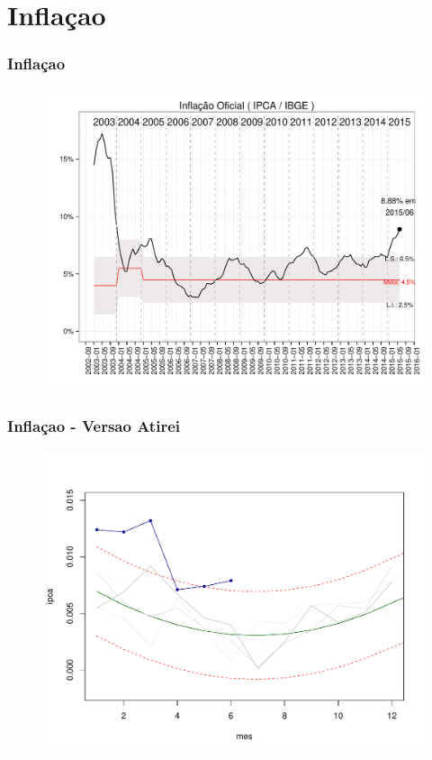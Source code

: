 \documentclass{beamer}
\begin{document}
\section{Inflaçao}
\begin{frame}
  \frametitle{Inflaçao}
  \begin{figure}[ht]
      \centering
      \includegraphics[width=1.00\textwidth]{Inflacao.pdf}
  \end{figure}
\end{frame}


\begin{frame}
  \frametitle{Inflaçao - Versao Atirei}
  \begin{figure}[ht]
      \centering
    \includegraphics[width=1.00\textwidth]{IPCAatirei.pdf}
  \end{figure}
\end{frame}
\end{document}
